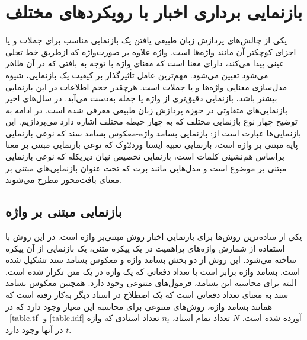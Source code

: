 
\section{بازنمایی برداری اخبار با رویکردهای مختلف}
یکی از چالش‌های پردازش زبان طبیعی یافتن یک بازنمایی مناسب برای جملات و یا اجزای کوچکتر آن مانند واژه‌ها است. واژه علاوه بر صورت‌واژه که ازطریق خط تجلی عینی پیدا می‌کند، دارای معنا است که معنای واژه با توجه به بافتی که در آن ظاهر می‌شود تعیین می‌شود. مهم‌ترین عامل تأثیرگذار بر کیفیت یک بازنمایی، شیوه مدل‌سازی معنایی واژه‌ها و یا جملات است. هرچقدر حجم اطلاعات در این بازنمایی بیشتر باشد، بازنمایی دقیق‌تری از واژه یا جمله به‌دست می‌آید. در سال‌های اخیر بازنمایی‌های متفاوتی در حوزه پردازش زبان طبیعی معرفی شده ‌است. در ادامه به توضیح چهار نوع بازنمایی مختلف که به چهار حیطه مختلف اشاره دارد می‌پردازیم. این بازنمایی‌ها عبارت است از: بازنمایی بسامد واژه-معکوس بسامد سند که نوعی بازنمایی پایه مبتنی ‌بر واژه است، بازنمایی تعبیه ایستا ورد2وک که نوعی بازنمایی مبتنی ‌بر معنا براساس هم‌نشینی کلمات است، بازنمایی تخصیص نهان دیریکله که نوعی بازنمایی مبتنی ‌بر موضوع است و مدل‌هایی مانند برت که تحت عنوان بازنمایی‌های مبتنی‌ بر معنای بافت‌محور مطرح می‌شوند.

\subsection{بازنمایی مبتنی ‌بر واژه}
یکی از ساده‌ترین روش‌ها برای بازنمایی اخبار روش مبتنی‌بر واژه است. در این روش با استفاده از شمارش واژه‌های پراهمیت در یک پیکره متنی، یک بازنمایی از آن‌ پیکره ساخته می‌شود. این روش از دو بخش بسامد واژه و معکوس بسامد سند تشکیل شده‌ است. بسامد واژه برابر است با تعداد دفعاتی که یک واژه در یک متن تکرار شده‌ است. البته برای محاسبه این بسامد، فرمول‌های متنوعی وجود دارد. همچنین معکوس بسامد سند به معنای تعداد دفعاتی است که یک اصطلاح در اسناد دیگر به‌کار رفته‌ است که همانند بسامد واژه، روش‌های متنوعی برای محاسبه این معیار وجود دارد که در \tablename~\ref{table.tf} و \ref{table.idf} آورده شده‌ است. $N$ تعداد تمام اسناد، $n_t$ تعداد اسنادی که واژه $t$ در آنها وجود دارد.

